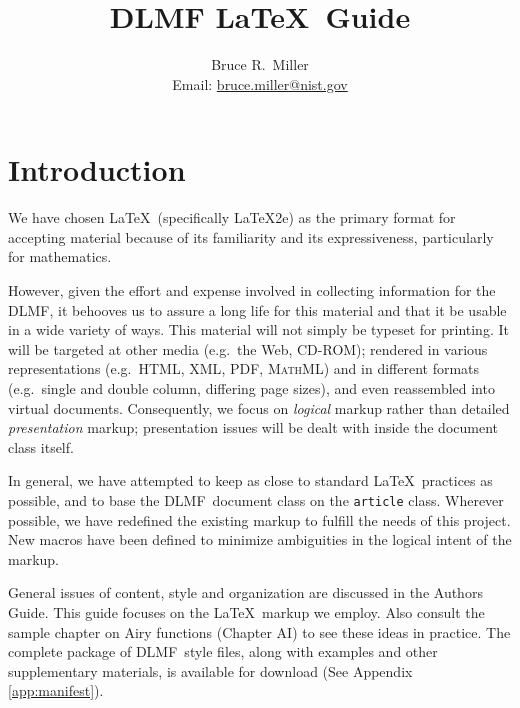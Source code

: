 \documentclass[twoside]{article}
\title{DLMF \LaTeX\ Guide}
\author{Bruce R.~Miller \\ Email: \url{bruce.miller@nist.gov}}
\newcommand{\DLMF}{{\sc DLMF}}
\newcommand{\HTML}{\textsc{HTML}}
\newcommand{\XML}{\textsc{XML}}
\newcommand{\PDF}{\textsc{PDF}}
\newcommand{\MathML}{\textsc{MathML}}
\newcommand{\token}[1]{\texttt{#1}}
\begin{document}
\maketitle
\section{Introduction}\label{sec:intro}
We have chosen \LaTeX\ (specifically \LaTeX2e)  as the primary format for accepting 
material because of its familiarity and its expressiveness, particularly 
for mathematics.

However, given the effort and expense involved in collecting information for the \DLMF, 
it behooves us to assure a long life for this material and that it be usable
in a wide variety of ways.  
This material will not simply be typeset for printing.
It will be targeted at other media (e.g.~the Web, CD-ROM);
rendered in various representations (e.g.~\HTML, \XML, \PDF, \MathML)
and  in different formats (e.g.~single and double column, differing page sizes),
and even reassembled into virtual documents.
Consequently, we focus on \textit{logical} markup rather than detailed
\textit{presentation}
markup; presentation issues will be dealt with inside the document class itself.

In general, we have attempted to keep as close to standard \LaTeX\ practices
as possible, and to base the \DLMF\ document class on the \token{article} class.
Wherever possible, we have redefined the existing markup to fulfill 
the needs of this project.  New macros have been defined to minimize ambiguities 
in the logical intent of the markup.

General issues of content, style and organization are discussed in the
Authors Guide.  This guide focuses on the \LaTeX\ markup we employ.
Also consult the sample chapter on Airy functions (Chapter AI)
to see these ideas in practice.
The complete package of \DLMF\ style files, along with examples and other supplementary
materials, is available for download (See Appendix \ref{app:manifest}).
\end{document}
